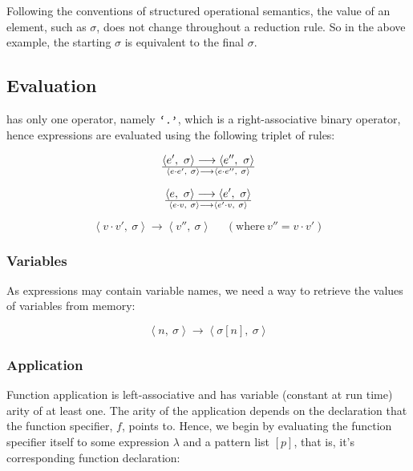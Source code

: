 Following the conventions of structured operational semantics, the value of an
element, such as $\sigma$, does not change throughout a reduction rule. So in
the above example, the starting $\sigma$ is equivalent to the final $\sigma$.

\subsection{Evaluation}

 has only one operator, namely $\text{{\ttfamily`.'}}$, which is a right-associative
binary operator, hence expressions are evaluated using the following triplet of
rules:

\begin{equation}
{
\left\langle e',\ \sigma\right\rangle
\longrightarrow
\left\langle e'',\ \sigma\right\rangle
}\over {
\left\langle e \cdot e',\ \sigma\right\rangle
\longrightarrow
\left\langle e \cdot e'',\ \sigma\right\rangle
}
\end{equation}

\begin{equation}
{
\left\langle e,\ \sigma\right\rangle
\longrightarrow
\left\langle e',\ \sigma\right\rangle
}\over {
\left\langle e\cdot v,\ \sigma\right\rangle
\longrightarrow
\left\langle e' \cdot v,\ \sigma\right\rangle
}
\end{equation}

\begin{equation}
\left\langle v \cdot v',\ \sigma\right\rangle
\longrightarrow
\left\langle v'',\ \sigma\right\rangle
\ \ \ \ \ \ (\text{where}\ v'' = v \cdot v')
\end{equation}

\subsubsection{Variables}

As expressions may contain variable names, we need a way to retrieve the values
of variables from memory:

\begin{equation}
\left\langle n,\ \sigma\right\rangle
\longrightarrow
\left\langle \sigma[n],\ \sigma\right\rangle
\end{equation}

\subsubsection{Application}

Function application is left-associative and has variable (constant at run
time) arity of at least one. The arity of the application depends on the
declaration that the function specifier, $f$, points to. Hence, we begin by
evaluating the function specifier itself to some expression $\lambda$ and a
pattern list $[p]$, that is, it's corresponding function declaration:

